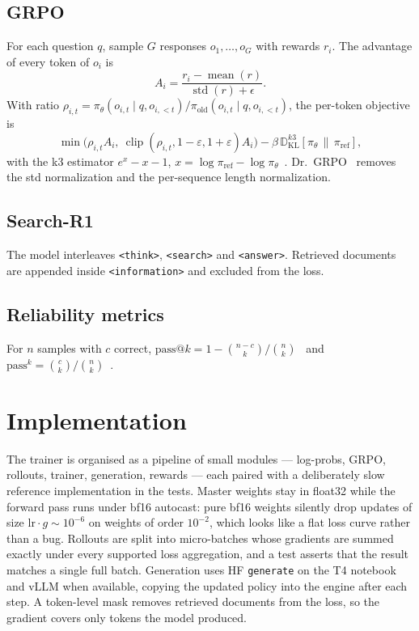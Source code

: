 \documentclass[11pt]{article}
\begin{document}
\subsection{GRPO}
For each question $q$, sample $G$ responses $o_1,\dots,o_G$ with rewards $r_i$. The advantage
of every token of $o_i$ is
\begin{equation}
  A_i = \frac{r_i - \operatorname{mean}(r)}{\operatorname{std}(r) + \epsilon}.
\end{equation}
With ratio $\rho_{i,t} = \pi_\theta(o_{i,t}\mid q,o_{i,<t}) / \pi_{\text{old}}(o_{i,t}\mid q,o_{i,<t})$,
the per-token objective is
\begin{equation}
  \min\!\big(\rho_{i,t} A_i,\ \operatorname{clip}(\rho_{i,t}, 1-\varepsilon, 1+\varepsilon) A_i\big)
  - \beta\, \mathbb{D}_{\text{KL}}^{k3}\!\left[\pi_\theta \,\|\, \pi_{\text{ref}}\right],
\end{equation}
with the k3 estimator $e^{x} - x - 1$, $x = \log \pi_{\text{ref}} - \log \pi_\theta$~\cite{shao2024deepseekmath}.
Dr.~GRPO~\cite{liu2025drgrpo} removes the std normalization and the per-sequence length normalization.

\subsection{Search-R1}
The model interleaves \texttt{<think>}, \texttt{<search>} and \texttt{<answer>}. Retrieved
documents are appended inside \texttt{<information>} and excluded from the loss.

\subsection{Reliability metrics}
For $n$ samples with $c$ correct, $\text{pass@}k = 1 - \binom{n-c}{k}/\binom{n}{k}$~\cite{chen2021codex}
and $\text{pass}^k = \binom{c}{k}/\binom{n}{k}$~\cite{yao2024taubench}.

\section{Implementation}
The trainer is organised as a pipeline of small modules --- log-probs, GRPO, rollouts, trainer,
generation, rewards --- each paired with a deliberately slow reference implementation in the
tests. Master weights stay in float32 while the forward pass runs under bf16 autocast: pure
bf16 weights silently drop updates of size $\mathrm{lr}\cdot g \sim 10^{-6}$ on weights of
order $10^{-2}$, which looks like a flat loss curve rather than a bug. Rollouts are split into
micro-batches whose gradients are summed exactly under every supported loss aggregation, and
a test asserts that the result matches a single full batch. Generation uses HF
\texttt{generate} on the T4 notebook and vLLM when available, copying the updated policy into
the engine after each step. A token-level mask removes retrieved documents from the loss, so
the gradient covers only tokens the model produced.
\end{document}
